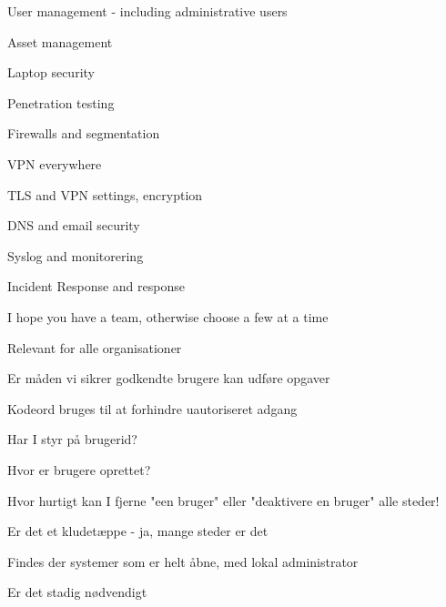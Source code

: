 \documentclass[Screen16to9,17pt]{foils}
\begin{document}
\begin{list2}
\item User management - including administrative users
\item Asset management
\item Laptop security
\item Penetration testing
\item Firewalls and segmentation
\item VPN everywhere
\item TLS and VPN settings, encryption
\item DNS and email security
\item Syslog and monitorering
\item Incident Response and response
\end{list2}

\vskip 5mm
\centerline{I hope you have a team, otherwise choose a few at a time}





\begin{list2}
\item Relevant for alle organisationer
\item Er måden vi sikrer godkendte brugere kan udføre opgaver
\item Kodeord bruges til at forhindre uautoriseret adgang
\item Har I styr på brugerid?
\item Hvor er brugere oprettet?
\item Hvor hurtigt kan I fjerne "een bruger" eller "deaktivere en bruger" alle steder!
\item Er det et kludetæppe - ja, mange steder er det
\end{list2}




\begin{list2}
\item Findes der systemer som er helt åbne, med lokal administrator
\item Er det stadig nødvendigt
\end{list2}


\end{document}
